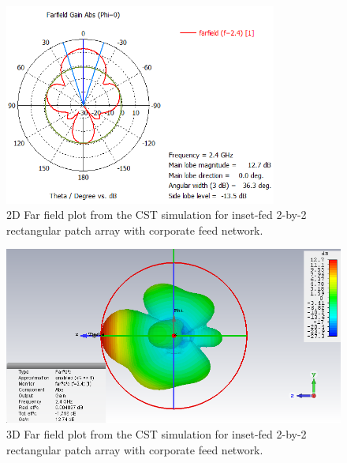 \documentclass[12pt, oneandhalf, chaparabic, sees, ms]{metu}
\begin{document}
\begin{figure}[!htbp]
 \begin{center}
  \includegraphics[width=0.8\textwidth]{T2x2-rect-pa-corp-feed-FR4-018mm-connected-by-boolean-add-Farfield-24GHz-2D.png}
 \end{center}
 \caption{2D Far field plot from the CST simulation for inset-fed 2-by-2 rectangular patch array with corporate feed network.}
  \label{fig:corp-FR4-farf2d}
\end{figure}


\begin{figure}[!htbp]
 \begin{center}
  \includegraphics[width=\textwidth]{T2x2-rect-pa-corp-feed-FR4-018mm-connected-by-boolean-add-Farfield-24GHz-3D.png}
 \end{center}
 \caption{3D Far field plot from the CST simulation for inset-fed 2-by-2 rectangular patch array with corporate feed network.}
  \label{fig:corp-FR4-farf3d}
\end{figure}
\end{document}
